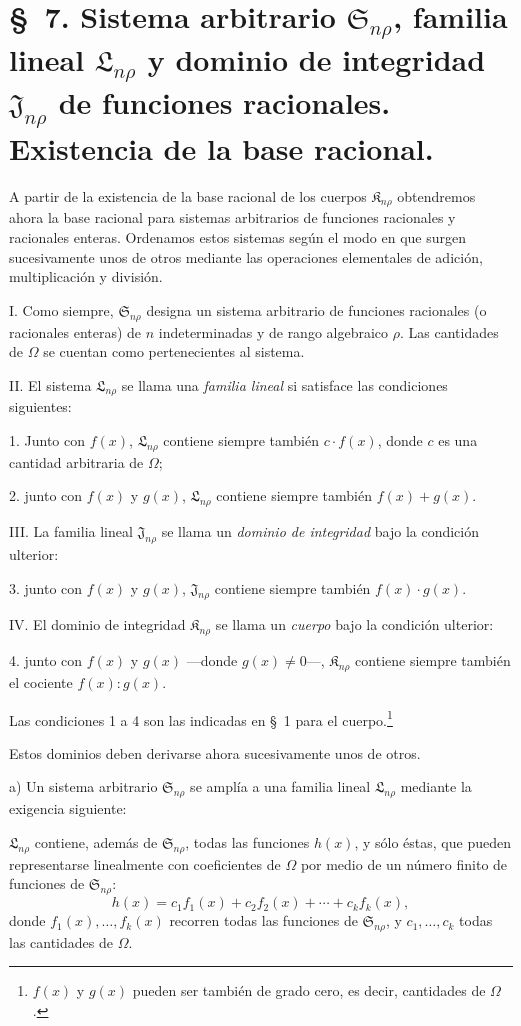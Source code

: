 \documentclass[11pt]{article}
\providecommand{\Kfield}{\mathfrak{K}}
\providecommand{\Ssys}{\mathfrak{S}}
\providecommand{\Lsys}{\mathfrak{L}}
\providecommand{\Jdom}{\mathfrak{J}}
\begin{document}
\section*{\S\ 7. Sistema arbitrario $\Ssys_{n\rho}$, familia lineal $\Lsys_{n\rho}$ y dominio de integridad $\Jdom_{n\rho}$ de funciones racionales. Existencia de la base racional.}

A partir de la existencia de la base racional de los cuerpos $\Kfield_{n\rho}$ obtendremos ahora la base racional para sistemas arbitrarios de funciones racionales y racionales enteras. Ordenamos estos sistemas según el modo en que surgen sucesivamente unos de otros mediante las operaciones elementales de adición, multiplicación y división.

I. Como siempre, $\Ssys_{n\rho}$ designa un sistema arbitrario de funciones racionales (o racionales enteras) de $n$ indeterminadas y de rango algebraico $\rho$. Las cantidades de $\Omega$ se cuentan como pertenecientes al sistema.

II. El sistema $\Lsys_{n\rho}$ se llama una \emph{familia lineal} si satisface las condiciones siguientes:

1. Junto con $f(x)$, $\Lsys_{n\rho}$ contiene siempre también $c\cdot f(x)$, donde $c$ es una cantidad arbitraria de $\Omega$;

2. junto con $f(x)$ y $g(x)$, $\Lsys_{n\rho}$ contiene siempre también $f(x)+g(x)$.

III. La familia lineal $\Jdom_{n\rho}$ se llama un \emph{dominio de integridad} bajo la condición ulterior:

3. junto con $f(x)$ y $g(x)$, $\Jdom_{n\rho}$ contiene siempre también $f(x)\cdot g(x)$.

IV. El dominio de integridad $\Kfield_{n\rho}$ se llama un \emph{cuerpo} bajo la condición ulterior:

4. junto con $f(x)$ y $g(x)$ ---donde $g(x)\ne0$---, $\Kfield_{n\rho}$ contiene siempre también el cociente $f(x):g(x)$.

Las condiciones 1 a 4 son las indicadas en \S\ 1 para el cuerpo.\footnote{$f(x)$ y $g(x)$ pueden ser también de grado cero, es decir, cantidades de $\Omega$.}

Estos dominios deben derivarse ahora sucesivamente unos de otros.

a) Un sistema arbitrario $\Ssys_{n\rho}$ se amplía a una familia lineal $\Lsys_{n\rho}$ mediante la exigencia siguiente:

$\Lsys_{n\rho}$ contiene, además de $\Ssys_{n\rho}$, todas las funciones $h(x)$, y sólo éstas, que pueden representarse linealmente con coeficientes de $\Omega$ por medio de un número finito de funciones de $\Ssys_{n\rho}$:
\[
  h(x)=c_1f_1(x)+c_2f_2(x)+\cdots+c_kf_k(x),
\]
donde $f_1(x),\ldots,f_k(x)$ recorren todas las funciones de $\Ssys_{n\rho}$, y $c_1,
\ldots,c_k$ todas las cantidades de $\Omega$.
\end{document}

